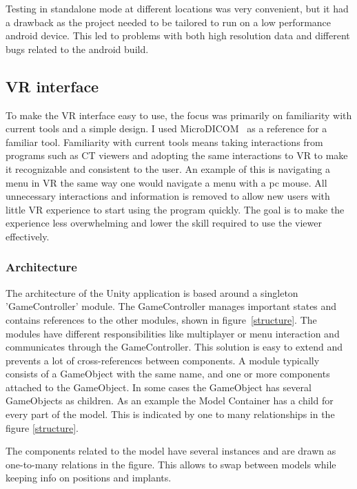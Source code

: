 \documentclass[a4paper]{report}
\begin{document}
Testing in standalone mode at different locations was very convenient, but it had a drawback as the project needed to be tailored to run on a low performance android device. This led to problems with both high resolution data and different bugs related to the android build.

\subsection{VR interface}


To make the VR interface easy to use, the focus was primarily on familiarity with current tools and a simple design.
I used MicroDICOM~\cite{noauthor_dicom_nodate-1} as a reference for a familiar tool.
Familiarity with current tools means taking interactions from programs such as CT viewers and adopting the same interactions to VR to make it recognizable and consistent to the user. An example of this is navigating a menu in VR the same way one would navigate a menu with a pc mouse.
 All unnecessary interactions and information is removed to allow new users with little VR experience to start using the program quickly. The goal is to make the experience less overwhelming and lower the skill required to use the viewer effectively.

\subsubsection{Architecture}
The architecture of the Unity application is based around a singleton 'GameController' module. The GameController manages important states and contains references to the other modules, shown in figure~\ref{structure}. The modules have different responsibilities like multiplayer or menu interaction and communicates through the GameController. This solution is easy to extend and prevents a lot of cross-references between components.
A module typically consists of a GameObject with the same name, and one or more components attached to the GameObject. In some cases the GameObject has several GameObjects as children.
As an example the Model Container has a child for every part of the model. This is indicated by one to many relationships in the figure \ref{structure}.


The components related to the model have several instances and are drawn as one-to-many relations in the figure. This allows to swap between models while keeping info on positions and implants.
\end{document}
